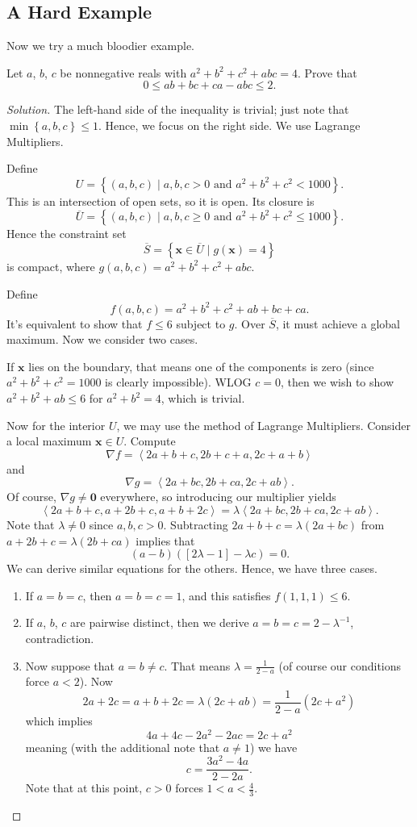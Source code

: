 \documentclass[11pt]{scrartcl}
\begin{document}
\subsection{A Hard Example}
Now we try a much bloodier example.
\begin{example}
  [USAMO 2001/3] Let $a$, $b$, $c$ be nonnegative
  reals with $a^2+b^2+c^2+abc=4$.
  Prove that
  \[ 0 \le ab + bc + ca - abc \le 2. \]
\end{example}

\begin{proof}[Solution]
The left-hand side of the inequality is trivial;
just note that $\min \left\{ a,b,c \right\} \le 1$.
Hence, we focus on the right side.
We use Lagrange Multipliers.

Define \[ U = \left\{ (a,b,c) \mid a,b,c > 0
  \text{ and } a^2+b^2+c^2 < 1000 \right\}. \]
This is an intersection of open sets, so it is open.
Its closure is
\[ \overline U = \left\{ (a,b,c) \mid a,b,c \ge 0
\text{ and } a^2+b^2+c^2 \le 1000 \right\}. \]
Hence the constraint set
\[ \overline S = \left\{ \mathbf x \in \overline U \mid g(\mathbf x) = 4 \right\} \]
is compact, where $g(a,b,c) = a^2+b^2+c^2+abc$.

Define \[ f(a,b,c) = a^2+b^2+c^2+ab+bc+ca. \]
It's equivalent to show that $f \le 6$ subject to $g$.
Over $\overline S$, it must achieve a global maximum.
Now we consider two cases.

If $\mathbf x$ lies on the boundary,
that means one of the components is zero
(since $a^2+b^2+c^2=1000$ is clearly impossible).
WLOG $c=0$, then we wish to show $a^2+b^2+ab \le 6$
for $a^2+b^2=4$, which is trivial.

Now for the interior $U$, we may use the method of Lagrange Multipliers.
Consider a local maximum $\mathbf x \in U$.
Compute \[ \nabla f = \left<2a+b+c, 2b+c+a, 2c+a+b \right> \]
and \[ \nabla g = \left<2a+bc, 2b+ca, 2c+ab\right>. \]
Of course, $\nabla g \neq \mathbf 0$ everywhere,
so introducing our multiplier yields
\[ \left<2a+b+c,a+2b+c,a+b+2c\right> = \lambda \left<2a+bc,2b+ca,2c+ab\right>. \]
Note that $\lambda \neq 0$ since $a,b,c > 0$.
Subtracting $2a+b+c = \lambda(2a+bc)$ from $a+2b+c = \lambda(2b+ca)$
implies that \[ (a-b)(\left[ 2\lambda - 1 \right] - \lambda c) = 0. \]
We can derive similar equations for the others.
Hence, we have three cases.
\begin{enumerate}
  \item If $a=b=c$, then $a=b=c=1$, and this satisfies $f(1,1,1) \le 6$.
  \item If $a$, $b$, $c$ are pairwise distinct,
  then we derive $a = b = c = 2 - \lambda^{-1}$, contradiction.
  \item Now suppose that $a=b \neq c$.
  That means $\lambda = \frac{1}{2-a}$
  (of course our conditions force $a < 2$).
  Now \[ 2a+2c = a+b+2c = \lambda (2c+ab) = \frac{1}{2-a} (2c+a^2) \]
  which implies \[ 4a+4c-2a^2-2ac = 2c+a^2 \] meaning
  (with the additional note that $a \neq 1$) we have \[ c =
  \frac{3a^2-4a}{2-2a}. \]
  Note that at this point, $c > 0$ forces $1 < a < \frac 43$.
\end{enumerate}


\end{proof}
\end{document}
